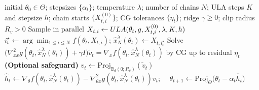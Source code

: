 \documentclass[10pt,a4paper]{amsart}
\begin{document}
\begin{algorithm}[t]
\caption{\textsc{HG-MS}: Hyper-gradient with minima selection}
\begin{algorithmic}[1]
\Require initial $\theta_0\in\Theta$; stepsizes $\{\alpha_t\}$; temperature $\lambda$; number of chains $N$; ULA steps $K$ and stepsize $h$; chain starts $\{X^{(0)}_{t,i}\}$; CG tolerances $\{\eta_t\}$; ridge $\gamma\ge 0$; clip radius $R_v>0$
    \State Sample in parallel $X_{t,i}\gets \textsc{ULA}(\theta_t,g,X^{(0)}_{t,i},\lambda,K,h)$
    \State $i_t^\star\gets\arg\min_{1\le i\le N} f(\theta_t,X_{t,i})$; \quad
    $\hat{x}_N^\lambda(\theta_t)\gets X_{t,i_t^\star}$
    \State Solve
    \(
        \big(\nabla^2_{xx}g(\theta_t,\hat{x}_N^\lambda(\theta_t))+\gamma I\big)\tilde v_t
        =
        \nabla_x f(\theta_t,\hat{x}_N^\lambda(\theta_t))
    \)
    by CG up to residual $\eta_t$
    \State \textbf{(Optional safeguard)} $v_t\gets \mathrm{Proj}_{\mathbb B_d(0;R_v)}(\tilde v_t)$
    \State $\widehat h_t\gets
    \nabla_\theta f(\theta_t,\hat{x}_N^\lambda(\theta_t))
    -
    \nabla^2_{\theta x}g(\theta_t,\hat{x}_N^\lambda(\theta_t))v_t$; $\quad \theta_{t+1}\gets
    \mathrm{Proj}_{\Theta}\big(\theta_t-\alpha_t\widehat h_t\big)$
\EndFor
\end{algorithmic}
\label{alg:hg-minsel-lmc}
\end{algorithm}
\end{document}
